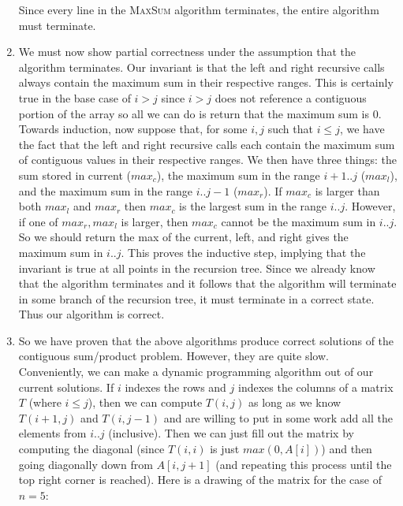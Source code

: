 \documentclass{article}
\begin{document}
\begin{enumerate}
        Since every line in the \textsc{MaxSum} algorithm terminates, the entire algorithm must terminate.
    \item We must now show partial correctness under the assumption that the algorithm terminates.
        Our invariant is that the left and right recursive calls always contain the maximum sum in their respective ranges.
        This is certainly true in the base case of $i > j$ since $i > j$ does not reference a contiguous portion of the array so all we can do is return that the maximum sum is 0.
        Towards induction, now suppose that, for some $i,j$ such that $i \leq j$, we have the fact that the left and right recursive calls each contain the maximum sum of contiguous values in their respective ranges.
        We then have three things: the sum stored in current ($max_c$), the maximum sum in the range $i+1..j$ ($max_l$), and the maximum sum in the range $i..j-1$ ($max_r$).
        If $max_c$ is larger than both $max_l$ and $max_r$ then $max_c$ is the largest sum in the range $i..j$.
        However, if one of $max_r, max_l$ is larger, then $max_c$ cannot be the maximum sum in $i..j$.
        So we should return the max of the current, left, and right gives the maximum sum in $i..j$.
        This proves the inductive step, implying that the invariant is true at all points in the recursion tree.
        Since we already know that the algorithm terminates and it follows that the algorithm will terminate in some branch of the recursion tree, it must terminate in a correct state.
        Thus our algorithm is correct.
    \item So we have proven that the above algorithms produce correct solutions of the contiguous sum/product problem.
        However, they are quite slow.
        Conveniently, we can make a dynamic programming algorithm out of our current solutions.
        If $i$ indexes the rows and $j$ indexes the columns of a matrix $T$ (where $i \leq j$), then we can compute $T(i, j)$ as long as we know $T(i+1, j)$ and $T(i, j-1)$ and are willing to put in some work add all the elements from $i..j$ (inclusive).
        Then we can just fill out the matrix by computing the diagonal (since $T(i, i)$ is just $max (0, A[i])$) and then going diagonally down from $A[i, j+1]$ (and repeating this process until the top right corner is reached).
        Here is a drawing of the matrix for the case of $n=5$:


\end{enumerate}
\end{document}
